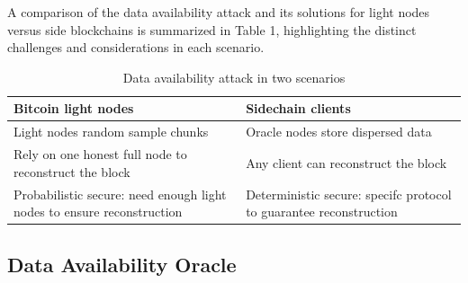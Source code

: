 \documentclass{report}
\begin{document}
A comparison of the data availability attack and its solutions for light nodes versus side blockchains is summarized in Table 1, highlighting the distinct challenges and considerations in each scenario.
\begin{table}[htbp]
	\centering
	\captionsetup{justification=centering}
	\caption[position=above]{Data availability attack in two scenarios}
	\begin{tabular}{|>{\centering\arraybackslash}p{8cm}|>{\centering\arraybackslash}p{8cm}|}
		\hline
		Bitcoin light nodes & Sidechain clients\\
		\hline
		Light nodes random sample chunks & Oracle nodes store dispersed data \\
		\hline
		Rely on one honest full node to	reconstruct the block & Any client can reconstruct the block \\
		\hline
		Probabilistic secure: need enough light nodes to ensure reconstruction & Deterministic secure: specifc protocol to guarantee reconstruction \\
		\hline
	\end{tabular}
\end{table}
\subsection{Data Availability Oracle}
\end{document}

